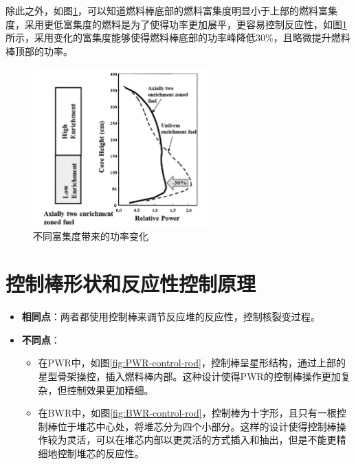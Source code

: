 \documentclass{article}
\begin{document}
除此之外，如图\ref{fig:BWR-power-distribution}，可以知道燃料棒底部的燃料富集度明显小于上部的燃料富集度，采用更低富集度的燃料是为了使得功率更加展平，更容易控制反应性，如图\ref{fig:BWR-power-distribution}所示，采用变化的富集度能够使得燃料棒底部的功率峰降低30\%，且略微提升燃料棒顶部的功率。

\begin{figure}[htbp]
    \centering
    \includegraphics[width=0.6\textwidth]{figures/BWR-power-distribution.png}
    \caption{不同富集度带来的功率变化}
    \label{fig:BWR-power-distribution}
\end{figure}

\section{控制棒形状和反应性控制原理}
\begin{itemize}
    \item \textbf{相同点}：两者都使用控制棒来调节反应堆的反应性，控制核裂变过程。
    \item \textbf{不同点}：
    \begin{itemize}
        \item 在PWR中，如图\ref{fig:PWR-control-rod}，控制棒呈星形结构，通过上部的星型骨架操控，插入燃料棒内部。这种设计使得PWR的控制棒操作更加复杂，但控制效果更加精细。
        \item 在BWR中，如图\ref{fig:BWR-control-rod}，控制棒为十字形，且只有一根控制棒位于堆芯中心处，将堆芯分为四个小部分。这样的设计使得控制棒操作较为灵活，可以在堆芯内部以更灵活的方式插入和抽出，但是不能更精细地控制堆芯的反应性。
    \end{itemize}
\end{itemize}
\end{document}
